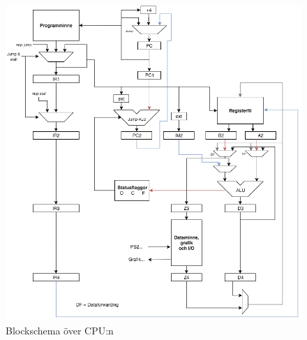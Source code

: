 \documentclass[a4paper,titlepage]{article}
\begin{document}
\begin{figure}[H]
	\centering
\includegraphics[width=14cm]{CPU.png}
	\caption{Blockschema över CPU:n}
\end{figure}
\end{document}
